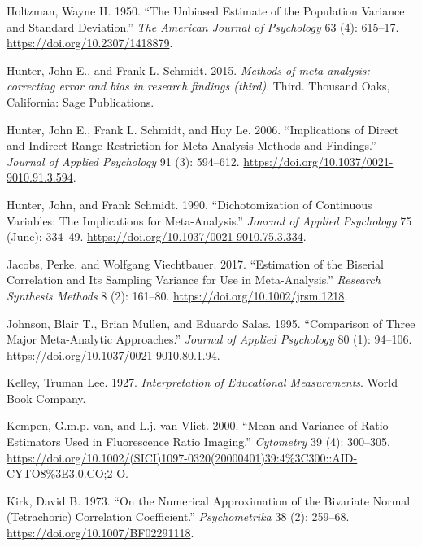 \documentclass[
  letterpaper,
  DIV=11,
  numbers=noendperiod]{scrreprt}
\newlength{\cslhangindent}
\newenvironment{CSLReferences}[2] %
 {\begin{list}{}{%
  \setlength{\itemindent}{0pt}
  \setlength{\leftmargin}{0pt}
  \setlength{\parsep}{0pt}
  \ifodd #1
   \setlength{\leftmargin}{\cslhangindent}
   \setlength{\itemindent}{-1\cslhangindent}
  \fi
  \setlength{\itemsep}{#2\baselineskip}}}
 {\end{list}}
\begin{document}
\begin{CSLReferences}{1}{0}
Holtzman, Wayne H. 1950. {``The Unbiased Estimate of the Population
Variance and Standard Deviation.''} \emph{The American Journal of
Psychology} 63 (4): 615--17. \url{https://doi.org/10.2307/1418879}.

Hunter, John E., and Frank L. Schmidt. 2015. \emph{Methods of
meta-analysis: correcting error and bias in research findings (third)}.
Third. Thousand Oaks, California: Sage Publications.

Hunter, John E., Frank L. Schmidt, and Huy Le. 2006. {``Implications of
Direct and Indirect Range Restriction for Meta-Analysis Methods and
Findings.''} \emph{Journal of Applied Psychology} 91 (3): 594--612.
\url{https://doi.org/10.1037/0021-9010.91.3.594}.

Hunter, John, and Frank Schmidt. 1990. {``Dichotomization of Continuous
Variables: The Implications for Meta-Analysis.''} \emph{Journal of
Applied Psychology} 75 (June): 334--49.
\url{https://doi.org/10.1037/0021-9010.75.3.334}.

Jacobs, Perke, and Wolfgang Viechtbauer. 2017. {``Estimation of the
Biserial Correlation and Its Sampling Variance for Use in
Meta-Analysis.''} \emph{Research Synthesis Methods} 8 (2): 161--80.
\url{https://doi.org/10.1002/jrsm.1218}.

Johnson, Blair T., Brian Mullen, and Eduardo Salas. 1995. {``Comparison
of Three Major Meta-Analytic Approaches.''} \emph{Journal of Applied
Psychology} 80 (1): 94--106.
\url{https://doi.org/10.1037/0021-9010.80.1.94}.

Kelley, Truman Lee. 1927. \emph{Interpretation of Educational
Measurements}. World Book Company.

Kempen, G.m.p. van, and L.j. van Vliet. 2000. {``Mean and Variance of
Ratio Estimators Used in Fluorescence Ratio Imaging.''} \emph{Cytometry}
39 (4): 300--305.
\url{https://doi.org/10.1002/(SICI)1097-0320(20000401)39:4\%3C300::AID-CYTO8\%3E3.0.CO;2-O}.

Kirk, David B. 1973. {``On the Numerical Approximation of the Bivariate
Normal (Tetrachoric) Correlation Coefficient.''} \emph{Psychometrika} 38
(2): 259--68. \url{https://doi.org/10.1007/BF02291118}.


\end{CSLReferences}
\end{document}
